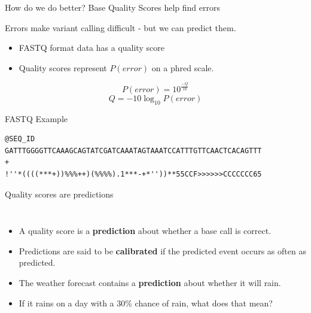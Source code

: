 \documentclass[table]{beamer}
\begin{document}
\begin{frame}[fragile]{How do we do better? Base Quality Scores help find errors}

Errors make variant calling difficult - but we can predict them.

\begin{itemize}
	\item FASTQ format data has a quality score
	\item Quality scores represent $P(error)$ on a phred scale.
\end{itemize}

\begin{displaymath}
	P(error) = 10^{\frac{-Q}{10}}
\end{displaymath}
\begin{displaymath}
	Q = -10\log_{10}{P(error)}
\end{displaymath}

\begin{block}{FASTQ Example}
\begin{verbatim}
@SEQ_ID
GATTTGGGGTTCAAAGCAGTATCGATCAAATAGTAAATCCATTTGTTCAACTCACAGTTT
+
!''*((((***+))%%%++)(%%%%).1***-+*''))**55CCF>>>>>>CCCCCCC65
\end{verbatim}
\end{block}


\end{frame}

\begin{frame}{Quality scores are predictions}
\begin{columns}
\begin{itemize}
\item A quality score is a \textbf{prediction} about whether a base call is correct.
\item Predictions are said to be \textbf{calibrated} if the predicted event occurs as often as predicted.
\item The weather forecast contains a \textbf{prediction} about whether it will rain.
\item If it rains on a day with a 30\% chance of rain, what does that mean?
\end{itemize}
\end{columns}
\end{frame}
\end{document}

